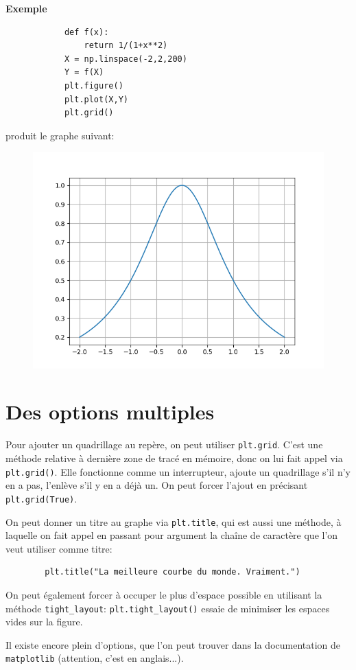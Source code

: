 \documentclass[10pt,xcolor={dvipsnames}]{beamer}
\newcounter{Exemple}
\newenvironment{exem}{
	\refstepcounter{Exemple}
	\begin{block}{\textbf{Exemple~\theExemple}}
	}{\end{block}}
\begin{document}
\begin{frame}[fragile]
	\begin{exem}
		\begin{lstlisting}
			def f(x):
				return 1/(1+x**2)
			X = np.linspace(-2,2,200)
			Y = f(X)
			plt.figure()
			plt.plot(X,Y)
			plt.grid()
		\end{lstlisting}
	produit le graphe suivant:
	\begin{figure}
		\includegraphics[height=0.5\textheight]{exemple_matplotlib_2.png}
	\end{figure}
	\end{exem}
\end{frame}

\section{Des options multiples}

\begin{frame}[fragile]
	Pour ajouter un quadrillage au repère, on peut utiliser \lstinline|plt.grid|. C'est une méthode relative à dernière zone de tracé en mémoire, donc on lui fait appel via \lstinline|plt.grid()|. Elle fonctionne comme un interrupteur, ajoute un quadrillage s'il n'y en a pas, l'enlève s'il y en a déjà un. On peut forcer l'ajout en précisant \lstinline|plt.grid(True)|.\pause
	
	On peut donner un titre au graphe via \lstinline|plt.title|, qui est aussi une méthode, à laquelle on fait appel en passant pour argument la chaîne de caractère que l'on veut utiliser comme titre:
	\begin{lstlisting}
		plt.title("La meilleure courbe du monde. Vraiment.")
	\end{lstlisting}\pause
	
	On peut également forcer à occuper le plus d'espace possible en utilisant la méthode \lstinline|tight_layout|: \lstinline|plt.tight_layout()| essaie de minimiser les espaces vides sur la figure.\pause
	
	Il existe encore plein d'options, que l'on peut trouver dans la documentation de \lstinline|matplotlib| (attention, c'est en anglais...).
\end{frame}
\end{document}
